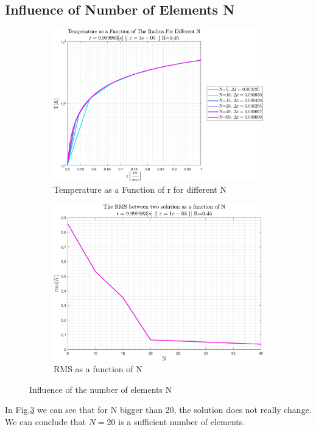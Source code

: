 \documentclass[11pt, a4paper]{article}
\begin{document}
\subsection{Influence of Number of Elements N}
\begin{figure}[H]
    \centering
    \begin{subfigure}[c]{0.49\textwidth}
        \centering
        \includegraphics[width=\textwidth]{images/Influenc of N.png}
        \caption{Temperature as a Function of r for different N}
        \label{fig: T vs r for diff N}
    \end{subfigure}
    \hfill
    \begin{subfigure}[c]{0.49\textwidth}
        \centering
        \includegraphics[width=\textwidth]{images/Influenc of N - error.png}
        \caption{RMS as a function of N}
        \label{fig: RMS vs N}
    \end{subfigure}
    \caption{Influence of the number of elements N}
    \label{fig: Influence of N}
\end{figure}
In Fig.\ref{fig: Influence of N} we can see that for N bigger than 20, the solution does not really change. We can conclude that $N=20$ is a sufficient number of elements.
\end{document}
